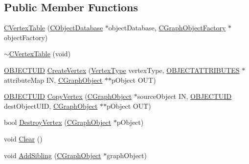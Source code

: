 \subsection*{Public Member Functions}
\begin{DoxyCompactItemize}
\item 
\hyperlink{class_n_m_1_1_o_d_b_1_1_c_vertex_table_a3862b9b2a29a5e43b7ef6dbee07e8836}{C\+Vertex\+Table} (\hyperlink{class_n_m_1_1_o_d_b_1_1_c_object_database}{C\+Object\+Database} $\ast$object\+Database, \hyperlink{class_n_m_1_1_o_d_b_1_1_c_graph_object_factory}{C\+Graph\+Object\+Factory} $\ast$object\+Factory)
\item 
\hyperlink{class_n_m_1_1_o_d_b_1_1_c_vertex_table_ae91221bed0ddbfe3bdb28d3526fa4b67}{$\sim$\+C\+Vertex\+Table} (void)
\item 
\hyperlink{namespace_n_m_1_1_o_d_b_a262b64fab56baaa96e18bac4ada88265}{O\+B\+J\+E\+C\+T\+U\+I\+D} \hyperlink{class_n_m_1_1_o_d_b_1_1_c_vertex_table_add5b10602223cd641b5dd503e86e0cbe}{Create\+Vertex} (\hyperlink{namespace_n_m_1_1_o_d_b_a74e0c94daaeea6f7e783c03a8c921022}{Vertex\+Type} vertex\+Type, \hyperlink{namespace_n_m_1_1_o_d_b_a8770283da9792324e1afe8104d40123b}{O\+B\+J\+E\+C\+T\+A\+T\+T\+R\+I\+B\+U\+T\+E\+S} $\ast$attribute\+Map I\+N, \hyperlink{class_n_m_1_1_o_d_b_1_1_c_graph_object}{C\+Graph\+Object} $\ast$$\ast$p\+Object O\+U\+T)
\item 
\hyperlink{namespace_n_m_1_1_o_d_b_a262b64fab56baaa96e18bac4ada88265}{O\+B\+J\+E\+C\+T\+U\+I\+D} \hyperlink{class_n_m_1_1_o_d_b_1_1_c_vertex_table_afb2bce5eba9132b17869930eac2b27df}{Copy\+Vertex} (\hyperlink{class_n_m_1_1_o_d_b_1_1_c_graph_object}{C\+Graph\+Object} $\ast$source\+Object I\+N, \hyperlink{namespace_n_m_1_1_o_d_b_a262b64fab56baaa96e18bac4ada88265}{O\+B\+J\+E\+C\+T\+U\+I\+D} dest\+Object\+U\+I\+D, \hyperlink{class_n_m_1_1_o_d_b_1_1_c_graph_object}{C\+Graph\+Object} $\ast$$\ast$p\+Object O\+U\+T)
\item 
bool \hyperlink{class_n_m_1_1_o_d_b_1_1_c_vertex_table_abe4bd94c203e37128e99c75afee8ea5c}{Destroy\+Vertex} (\hyperlink{class_n_m_1_1_o_d_b_1_1_c_graph_object}{C\+Graph\+Object} $\ast$p\+Object)
\item 
void \hyperlink{class_n_m_1_1_o_d_b_1_1_c_vertex_table_a86fcbaf8c65e5cb5d9963b5352120f7d}{Clear} ()
\item 
void \hyperlink{class_n_m_1_1_o_d_b_1_1_c_vertex_table_af00d1b7bfa9853437582121ab9b152a5}{Add\+Sibling} (\hyperlink{class_n_m_1_1_o_d_b_1_1_c_graph_object}{C\+Graph\+Object} $\ast$graph\+Object)
\item 

\end{DoxyCompactItemize}
